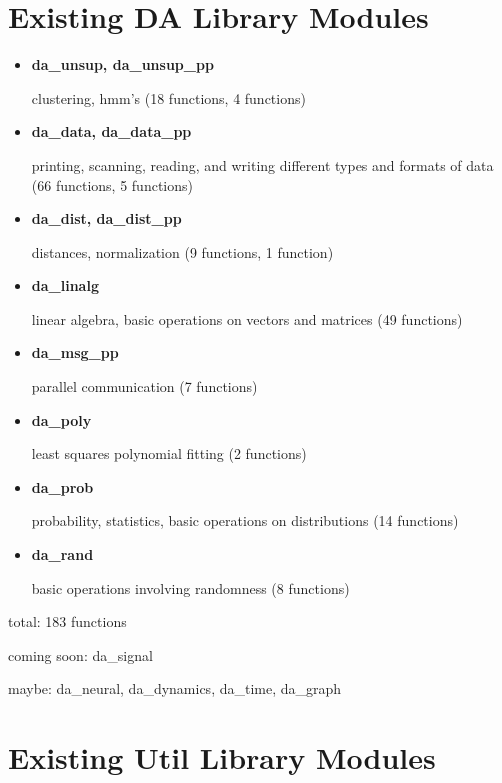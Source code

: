 \pagebreak
\appendix
\section{Existing DA Library Modules}

\begin{itemize}
\item {\bf da\_unsup, da\_unsup\_pp}

	clustering, hmm's 
	(18 functions, 4 functions)

\item {\bf da\_data, da\_data\_pp}

	printing, scanning, reading, and writing different types and formats of data
	(66 functions, 5 functions)

\item {\bf da\_dist, da\_dist\_pp}

	distances, normalization
	(9 functions, 1 function)

\item {\bf da\_linalg}

	linear algebra, basic operations on vectors and matrices
	(49 functions)

\item {\bf da\_msg\_pp}

	parallel communication
	(7 functions)

\item {\bf da\_poly}

	least squares polynomial fitting
	(2 functions)

\item {\bf da\_prob}

	probability, statistics, basic operations on distributions
	(14 functions)

\item {\bf da\_rand}

	basic operations involving randomness
	(8 functions)

\end{itemize}

total:  183 functions

coming soon: da\_signal

maybe: da\_neural, da\_dynamics, da\_time, da\_graph

\pagebreak
\section{Existing Util Library Modules}

